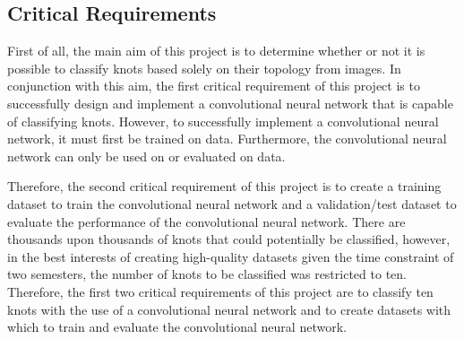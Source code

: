 \documentclass{l4proj}
\begin{document}
\subsection{Critical Requirements}
First of all, the main aim of this project is to determine whether or not it is possible to classify knots based solely on their topology from images.
In conjunction with this aim, the first critical requirement of this project is to successfully design and implement a convolutional neural network that is capable of classifying knots.
However, to successfully implement a convolutional neural network, it must first be trained on data.
Furthermore, the convolutional neural network can only be used on or evaluated on data.

Therefore, the second critical requirement of this project is to create a training dataset to train the convolutional neural network and a validation/test dataset to evaluate the performance of the convolutional neural network.
There are thousands upon thousands of knots that could potentially be classified, however, in the best interests of creating high-quality datasets given the time constraint of two semesters, the number of knots to be classified was restricted to ten.
Therefore, the first two critical requirements of this project are to classify ten knots with the use of a convolutional neural network and to create datasets with which to train and evaluate the convolutional neural network.
\end{document}
